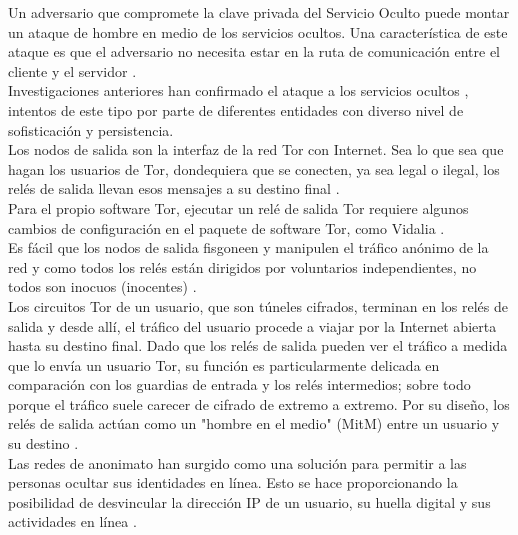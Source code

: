 \documentclass[10pt,letterpaper]{article}
\begin{document}
Un adversario que compromete la clave privada del Servicio Oculto puede montar un ataque de hombre en medio de los servicios ocultos. Una característica de este ataque es que el adversario no necesita estar en la ruta de comunicación entre el cliente y el servidor \cite{sanatinia2017off}.\\


Investigaciones anteriores han confirmado el ataque a los servicios ocultos \cite{noubir2016honey}, intentos de este tipo por parte de diferentes entidades con diverso nivel de sofisticación y persistencia.\\


Los nodos de salida son la interfaz de la red Tor con Internet. Sea lo que sea que hagan los usuarios de Tor, dondequiera que se conecten, ya sea legal o ilegal, los relés de salida llevan esos mensajes a su destino final \cite{ccalicskan2015technical}.\\

Para el propio software Tor, ejecutar un relé de salida Tor requiere algunos cambios de configuración en el paquete de software Tor, como Vidalia \cite{ccalicskan2015technical}. \\


Es fácil que los nodos de salida fisgoneen y manipulen el tráfico anónimo de la red y como todos los relés están dirigidos por voluntarios independientes, no todos son inocuos (inocentes) \cite{winter2014spoiled}.\\

Los circuitos Tor de un usuario, que son túneles cifrados, terminan en los relés de salida y desde allí, el tráfico del usuario procede a viajar por la Internet abierta hasta su destino final. Dado que los relés de salida pueden ver el tráfico a medida que lo envía un usuario Tor, su función es particularmente delicada en comparación con los guardias de entrada y los relés intermedios; sobre todo porque el tráfico suele carecer de cifrado de extremo a extremo. Por su diseño, los relés de salida actúan como un "hombre en el medio" (MitM) entre un usuario y su destino \cite{winter2014spoiled}.\\

Las redes de anonimato han surgido como una solución para permitir a las personas ocultar sus identidades en línea. Esto se hace proporcionando la posibilidad de desvincular la dirección IP de un usuario, su huella digital y sus actividades en línea \cite{alsabah2016performance}.\\
\end{document}
